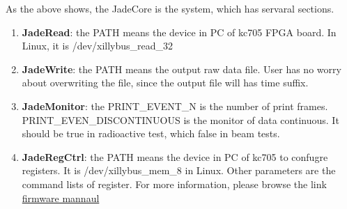 \documentclass[12pt,a4paper]{article}
\begin{document}
As the above shows, the JadeCore is the system, which has servaral
sections.
\begin{enumerate}
	\item{\textbf{JadeRead}: the PATH means the device in PC of kc705 FPGA board.
	      In Linux, it is /dev/xillybus\_read\_32}
	\item{\textbf{JadeWrite}: the PATH means the output raw data file. User has no
	      worry about overwriting the file, since the output file will has time
	suffix.}
	\item{\textbf{JadeMonitor}: the PRINT\_EVENT\_N is the number of print frames.
	      PRINT\_EVEN\_DISCONTINUOUS is the monitor of data continuous. It should
	be true in radioactive test, which false in beam tests.}
	\item{\textbf{JadeRegCtrl}: the PATH means the device in PC of kc705 to
	      confugre registers. It is /dev/xillybus\_mem\_8 in Linux. Other
	      parameters are the command lists of register. For more information,
	      please browse the link
	      \href{https://github.com/cepc/kc705/blob/v1.2/doc/Firmware\_v1.2\_Info.md}{firmware
	mannaul}}
\end{enumerate}
\end{document}
